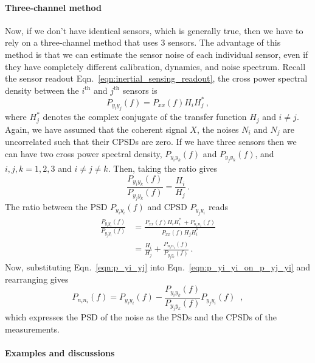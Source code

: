 \paragraph{Three-channel method}

Now, if we don't have identical sensors, which is generally true, then we have to rely on a three-channel method that uses 3 sensors.
The advantage of this method is that we can estimate the sensor noise of each individual sensor, even if they have completely different calibration, dynamics, and noise spectrum.
Recall the sensor readout Eqn.~\eqref{eqn:inertial_sensing_readout}, the cross power spectral density between the $i^\mathrm{th}$ and $j^\mathrm{th}$ sensors is
\begin{equation}
	P_{y_iy_j}(f) = P_{xx}(f)H_iH_j^*\,,
\end{equation}
where $H_j^*$ denotes the complex conjugate of the transfer function $H_j$ and $i\neq j$.
Again, we have assumed that the coherent signal $X$, the noises $N_i$ and $N_j$ are uncorrelated such that their CPSDs are zero.
If we have three sensors then we can have two cross power spectral density, $P_{y_iy_k}(f)$ and $P_{y_jy_k}(f)$, and $i,j,k=1,2,3$ and $i\neq j\neq k$.
Then, taking the ratio gives
\begin{equation}
	\frac{P_{y_iy_k}(f)}{P_{y_jy_k}(f)} = \frac{H_i}{H_j}\,.
	\label{eqn:p_yi_yj}
\end{equation}
The ratio between the PSD $P_{y_iy_i}(f)$ and CPSD $P_{y_jy_i}$ reads
\begin{equation}
	\begin{split}
	\frac{P_{y_iy_i}(f)}{P_{y_jy_i}(f)} &= \frac{P_{xx}(f)H_iH_i^*\ + P_{n_in_i}(f)}{P_{xx}(f)H_jH_i^*} \\
	&= \frac{H_i}{H_j} + \frac{P_{n_in_i}(f)}{P_{y_jy_i}(f)}\,.
	\end{split}
	\label{eqn:p_yi_yi_on_p_yj_yi}
\end{equation}
Now, substituting Eqn.~\eqref{eqn:p_yi_yj} into Eqn.~\eqref{eqn:p_yi_yi_on_p_yj_yi} and rearranging gives
\begin{equation}
	\boxed{
		P_{n_in_i}(f) = P_{y_iy_i}(f) - \frac{P_{y_iy_k}(f)}{P_{y_jy_k}(f)}P_{y_jy_i}(f)\,
	}\,\ ,
	\label{eqn:p_ni_ni_3channel}
\end{equation}
which expresses the PSD of the noise as the PSDs and the CPSDs of the measurements.

\paragraph{Examples and discussions}




